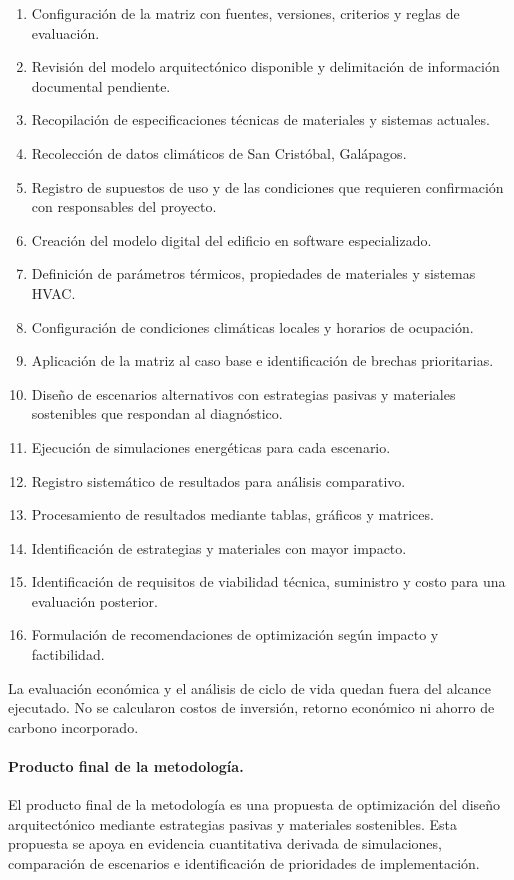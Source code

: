 \begin{textoDosTercios}
\begin{enumerate}
  \item Configuración de la matriz con fuentes, versiones, criterios y reglas de evaluación.
  \item Revisión del modelo arquitectónico disponible y delimitación de información documental pendiente.
  \item Recopilación de especificaciones técnicas de materiales y sistemas actuales.
  \item Recolección de datos climáticos de San Cristóbal, Galápagos.
  \item Registro de supuestos de uso y de las condiciones que requieren confirmación con responsables del proyecto.
  \item Creación del modelo digital del edificio en software especializado.
  \item Definición de parámetros térmicos, propiedades de materiales y sistemas HVAC.
  \item Configuración de condiciones climáticas locales y horarios de ocupación.
  \item Aplicación de la matriz al caso base e identificación de brechas prioritarias.
  \item Diseño de escenarios alternativos con estrategias pasivas y materiales sostenibles que respondan al diagnóstico.
  \item Ejecución de simulaciones energéticas para cada escenario.
  \item Registro sistemático de resultados para análisis comparativo.
  \item Procesamiento de resultados mediante tablas, gráficos y matrices.
  \item Identificación de estrategias y materiales con mayor impacto.
  \item Identificación de requisitos de viabilidad técnica, suministro y costo para una evaluación posterior.
  \item Formulación de recomendaciones de optimización según impacto y factibilidad.
\end{enumerate}
\end{textoDosTercios}

\begin{textoDosTercios}
La evaluación económica y el análisis de ciclo de vida quedan fuera del alcance ejecutado. No se calcularon costos de inversión, retorno económico ni ahorro de carbono incorporado.

\paragraph{Producto final de la metodología.}

El producto final de la metodología es una propuesta de optimización del diseño arquitectónico mediante estrategias pasivas y materiales sostenibles. Esta propuesta se apoya en evidencia cuantitativa derivada de simulaciones, comparación de escenarios e identificación de prioridades de implementación.
\end{textoDosTercios}


